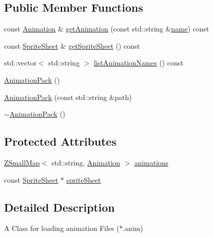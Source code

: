 \subsection*{Public Member Functions}
\begin{DoxyCompactItemize}
\item 
const \hyperlink{classZeta_1_1Animation}{Animation} \& \hyperlink{classZeta_1_1AnimationPack_adda733bd90a57d0307cb2731fd2a9ac3}{get\+Animation} (const std\+::string \&\hyperlink{classZeta_1_1Resource_a44c5721216f4beb31c0b3d2ef2aecf1d}{name}) const 
\item 
const \hyperlink{classZeta_1_1SpriteSheet}{Sprite\+Sheet} \& \hyperlink{classZeta_1_1AnimationPack_a08dbc3a645410b3a42e3831c85f5174e}{get\+Sprite\+Sheet} () const 
\item 
std\+::vector$<$ std\+::string $>$ \hyperlink{classZeta_1_1AnimationPack_a7f57cb4b8ec3f87a2ac982b12d669274}{list\+Animation\+Names} () const 
\item 
\hyperlink{classZeta_1_1AnimationPack_a22ce850bd316ed6925705110db62f600}{Animation\+Pack} ()
\item 
\hyperlink{classZeta_1_1AnimationPack_ac8e81972797da8e31bcabab51a9c2f64}{Animation\+Pack} (const std\+::string \&path)
\item 
\hyperlink{classZeta_1_1AnimationPack_a997cbde781439cd3d3add5f9337379f9}{$\sim$\+Animation\+Pack} ()
\end{DoxyCompactItemize}
\subsection*{Protected Attributes}
\begin{DoxyCompactItemize}
\item 
\hyperlink{namespaceZeta_a4c11e23ddc559dccdb5e85901d7dfb84}{Z\+Small\+Map}$<$ std\+::string, \hyperlink{classZeta_1_1Animation}{Animation} $>$ \hyperlink{classZeta_1_1AnimationPack_ad75ffd44330a99663b2d47247e51597b}{animations}
\item 
const \hyperlink{classZeta_1_1SpriteSheet}{Sprite\+Sheet} $\ast$ \hyperlink{classZeta_1_1AnimationPack_aaba44d7110313c7ce6e840a72d775dd9}{sprite\+Sheet}
\end{DoxyCompactItemize}


\subsection{Detailed Description}
A Class for loading animation Files ($\ast$.anim) 

